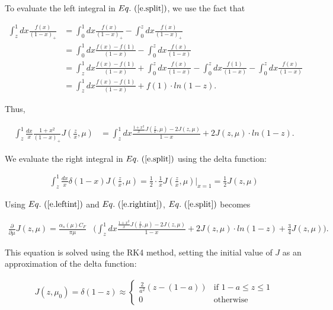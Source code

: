 \documentclass[floatfix,aps,prd,nofootinbib,superscriptaddress,preprint]{revtex4}
\newcommand\3[1]{\boldsymbol{#1}}
\newcommand{\eref}[1]{Eq.~(\ref{e.#1})}
\begin{document}
To evaluate the left integral in $\eref{split}$, we use the fact that

\begin{align*}
	\int_z^1 dx \frac{f(x)}{(1-x)_+} &= \int_0^1 dx \frac{f(x)}{(1-x)_+} - \int_0^z dx \frac{f(x)}{(1-x)_+} \\
	&= \int_0^1 dx \frac{f(x)-f(1)}{(1-x)} - \int_0^z dx \frac{f(x)}{(1-x)} \\
	&= \int_z^1 dx \frac{f(x)-f(1)}{(1-x)} + \int_0^z dx \frac{f(x)}{(1-x)} - \int_0^z dx \frac{f(1)}{(1-x)} - \int_0^z dx \frac{f(x)}{(1-x)} \\
	&= \int_z^1 dx \frac{f(x)-f(1)}{(1-x)} + f(1) \cdot ln (1-z).
\end{align*}

Thus,

\begin{align}
	\int_z^1 \frac{dx}{x}\frac{1+x^2}{(1-x)_+}J(\frac{z}{x}, \mu) &= \int_z^1 dx \frac{\frac{1+x^2}{x}J(\frac{z}{x}, \mu) - 2J(z, \mu)}{1-x} + 2J(z,\mu) \cdot ln (1-z).
    \label{e.leftint}
\end{align}

We evaluate the right integral in $\eref{split}$ using the delta function:

\begin{align}
	\int_z^1 \frac{dx}{x} \delta(1-x)J(\frac{z}{x}, \mu) = \frac{1}{2} \cdot \frac{1}{x} J(\frac{z}{x}, \mu)|_{x = 1} = \frac{1}{2}J(z, \mu)
    \label{e.rightint}
\end{align}

Using $\eref{leftint}$ and $\eref{rightint}$, $\eref{split}$ becomes

\begin{align}
	\frac{\partial}{\partial \mu} J(z, \mu) = \frac{\alpha_s(\mu) C_F}{\pi\mu} &\Big( \int_z^1 dx \frac{\frac{1+x^2}{x}J(\frac{z}{x}, \mu) - 2J(z, \mu)}{1-x} + 2J(z,\mu) \cdot ln (1-z) + \frac{3}{4}J(z, \mu) \Big).
    \label{e.dJdmu}
\end{align}

This equation is solved using the RK4 method, setting the initial value of $J$ as an approximation of the delta function: 

\begin{align*}
	J(z, \mu_0) = \delta(1-z) \approx 
    \begin{cases}
    	\frac{2}{a^2} (z-(1-a)) & \text{if } 1-a \leq z \leq 1 \\
        0 & \text{otherwise}
    \end{cases}
\end{align*}
\end{document}
